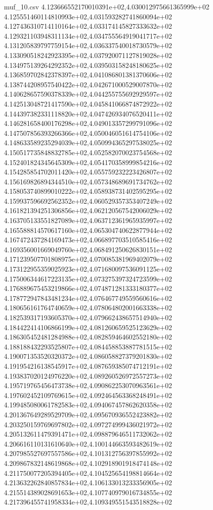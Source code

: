 \begin{filecontents*}{muf_10.csv}
4.123666552170010391e+02,4.030012975661365999e+02
4.125551460114810993e+02,4.031593282741860094e+02
4.127436310714110164e+02,4.033174145827333632e+02
4.129321103948311134e+02,4.034755564919041717e+02
4.131205839797759154e+02,4.036337540018730579e+02
4.133090518242923395e+02,4.037920071127819028e+02
4.134975139264292352e+02,4.039503158248180625e+02
4.136859702842378397e+02,4.041086801381370606e+02
4.138744208957540422e+02,4.042671000529007870e+02
4.140628657590378339e+02,4.044255755692929597e+02
4.142513048721417590e+02,4.045841066874872922e+02
4.144397382331118820e+02,4.047426934076520411e+02
4.146281658400176298e+02,4.049013357299791096e+02
4.147507856393266366e+02,4.050046051614754106e+02
4.148633589235294039e+02,4.050994365297538025e+02
4.150517735848832785e+02,4.052582070023754568e+02
4.152401824345645309e+02,4.054170358999854216e+02
4.154285854702011420e+02,4.055759232223426807e+02
4.156169826894344510e+02,4.057348689691734762e+02
4.158053740899010222e+02,4.058938731402595295e+02
4.159937596692562352e+02,4.060529357353407249e+02
4.161821394251306856e+02,4.062120567542006029e+02
4.163705133551827089e+02,4.063712361965935997e+02
4.165588814570617160e+02,4.065304740622877944e+02
4.167472437284169473e+02,4.066897703510585416e+02
4.169356001669049760e+02,4.068491250626830151e+02
4.171239507701808975e+02,4.070085381969402079e+02
4.173122955359025923e+02,4.071680097536091125e+02
4.175006344617223135e+02,4.073275397324723599e+02
4.176889675453219866e+02,4.074871281333180377e+02
4.178772947843481234e+02,4.076467749559560616e+02
4.180656161764740659e+02,4.078064802001663338e+02
4.182539317193605370e+02,4.079662438657514940e+02
4.184422414106866199e+02,4.081260659525123629e+02
4.186305452481284988e+02,4.082859464602552180e+02
4.188188432293525807e+02,4.084458853887781515e+02
4.190071353520320372e+02,4.086058827379201830e+02
4.191954216138545917e+02,4.087659385074712191e+02
4.193837020124976220e+02,4.089260526972557273e+02
4.195719765456473738e+02,4.090862253070963561e+02
4.197602452109769615e+02,4.092464563368248491e+02
4.199485080061782583e+02,4.094067457862620358e+02
4.201367649289529709e+02,4.095670936552423882e+02
4.203250159769697802e+02,4.097274999436021972e+02
4.205132611479391471e+02,4.098879646511732062e+02
4.206616110131610640e+02,4.100144663593482619e+02
4.207985527697557586e+02,4.101312756397855992e+02
4.209867832148619868e+02,4.102918901918474148e+02
4.211750077205394405e+02,4.104525654198814664e+02
4.213632262840857834e+02,4.106133013233356905e+02
4.215514389028691653e+02,4.107740979016734855e+02
4.217396455741958334e+02,4.109349551543518828e+02

\end{filecontents*}
